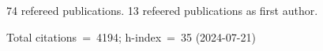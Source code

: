 74 refereed publications. 13 refeered publications as first author.

Total citations~=~4194; h-index~=~35 (2024-07-21)